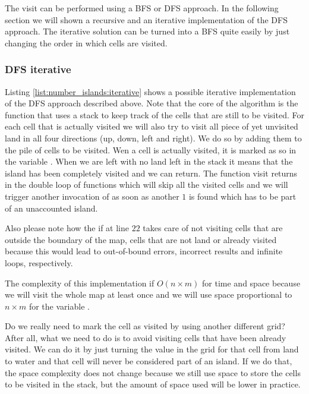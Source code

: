 The visit can be performed using a BFS or DFS approach. In the following section we will shown a recursive and an iterative implementation of the DFS approach. The iterative solution can be turned into a BFS quite easily by just changing the order in which cells are visited.


\subsubsection{DFS iterative}
Listing \ref{list:number_islands:iterative} shows a possible iterative implementation of the DFS approach described above. Note that the core of the algorithm is the function  that uses a stack to keep track of the cells that are still to be visited. For each cell that is actually visited we will also try to visit all piece of yet unvisited land in all four directions (up, down, left and right). We do so by adding them to the pile of cells to be visited. Wen a cell is actually visited, it is marked as so in the variable .
When we are left with no land left in the stack it means that the island has been completely visited and we can return. 
The function visit returns in the double loop of functions  which will skip all the visited cells and we will trigger another invocation of  as soon as another $1$ is found which has to be part of an unaccounted island.


Also please note how the if at line $22$ takes care of not visiting cells that are outside the boundary of the map, cells that are not land or already visited because this would lead to out-of-bound errors, incorrect results and infinite loops, respectively.

The complexity of this implementation if $O(n\times m)$ for time and space because we will visit the whole map at least once and we will use space proportional to $n\times m$ for the variable .



Do we really need to mark the cell as visited by using another different grid? After all, what we need to do is to avoid visiting cells that have been already visited. We can do it by just turning the value in the grid for that cell from land to water and that cell will never be considered part of an island. If we do that, the space complexity does not change because we still use space to store the cells to be visited in the stack, but the amount of space used will be lower in practice. 



